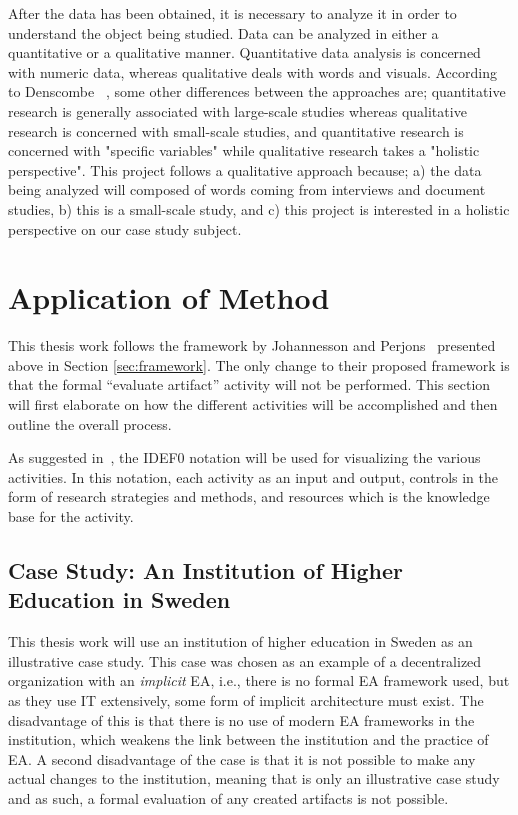 After the data has been obtained, it is necessary to analyze it in order to understand the object being studied. Data can be analyzed in either a quantitative or a qualitative manner. Quantitative data analysis is concerned with numeric data, whereas qualitative deals with words and visuals. According to Denscombe ~\cite{denscombe2010good}, some other differences between the approaches are; quantitative research is generally associated with large-scale studies whereas qualitative research is concerned with small-scale studies, and quantitative research is concerned with "specific variables" while qualitative research takes a "holistic perspective". This project follows a qualitative approach because; a) the data being analyzed will composed of words coming from interviews and document studies, b) this is a small-scale study, and c) this project is interested in a holistic perspective on our case study subject.

\section{Application of Method}

This thesis work follows the framework by Johannesson and Perjons~\cite{johannessonPerjons2012} presented above in Section \ref{sec:framework}. The only change to their proposed framework is that the formal ``evaluate artifact'' activity will not be performed. This section will first elaborate on how the different activities will be accomplished and then outline the overall process. 

As suggested in~\cite[Ch. 4]{johannessonPerjons2012}, the IDEF0 notation will be used for visualizing the various activities. In this notation, each activity as an input and output, controls in the form of research strategies and methods, and resources which is the knowledge base for the activity. 

\subsection{Case Study: An Institution of Higher Education in Sweden}
\label{sec:case}

This thesis work will use an institution of higher education in Sweden as an illustrative case study. This case was chosen as an example of a decentralized organization with an \textit{implicit} EA, i.e., there is no formal EA framework used, but as they use IT extensively, some form of implicit architecture must exist. The disadvantage of this is that there is no use of modern EA frameworks in the institution, which weakens the link between the institution and the practice of EA. A second disadvantage of the case is that it is not possible to make any actual changes to the institution, meaning that is only an illustrative case study and as such, a formal evaluation of any created artifacts is not possible. 

